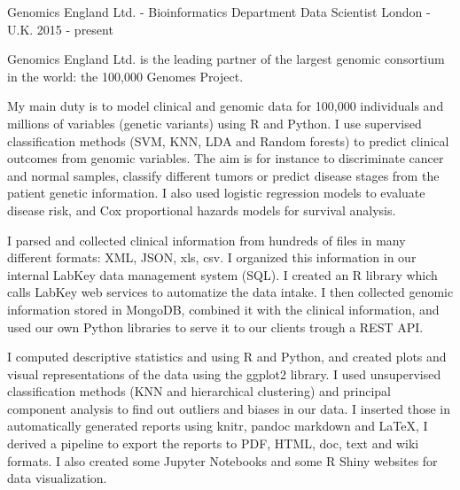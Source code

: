 \begin{cventries}
\cventry
{Genomics England Ltd. - Bioinformatics Department} %
{Data Scientist} %
{London - U.K.} %
{2015 - present} %
{ %
\begin{cvitems}
\item {
Genomics England Ltd.
is the leading partner of the 
largest genomic consortium in the world:
the 100,000 Genomes Project.
}
\item {
My main duty is to model clinical and genomic data for 100,000 individuals and millions of variables (genetic variants) using R and Python.
I use supervised classification methods (SVM, KNN, LDA and Random forests)
to predict clinical outcomes from genomic variables.
The aim is for instance to discriminate cancer and normal samples,
classify different tumors or predict disease stages from the patient genetic information.
I also used logistic regression models to evaluate disease risk,
and Cox proportional hazards models for survival analysis.
}
\item {
I parsed and collected clinical information from hundreds of files in many different formats: XML, JSON, xls, csv.
I organized this information in our internal LabKey data management system (SQL).
I created an R library which calls LabKey web services to automatize the data intake.
I then collected genomic information stored in MongoDB, combined it with the clinical information,
and used our own Python libraries to serve it to our clients trough a REST API.
}
\item {
I computed descriptive statistics and using R and Python,
and created plots and visual representations of the data using the ggplot2 library.
I used unsupervised classification methods (KNN and hierarchical clustering)
and principal component analysis
to find out outliers and biases in our data.
I inserted those in automatically generated reports using
knitr, pandoc markdown and LaTeX,
I derived a pipeline to export the reports to PDF, HTML, doc, text and wiki formats.
I also created some Jupyter Notebooks and some R Shiny websites for data visualization.
}
\end{cvitems}
}



\end{cventries}
